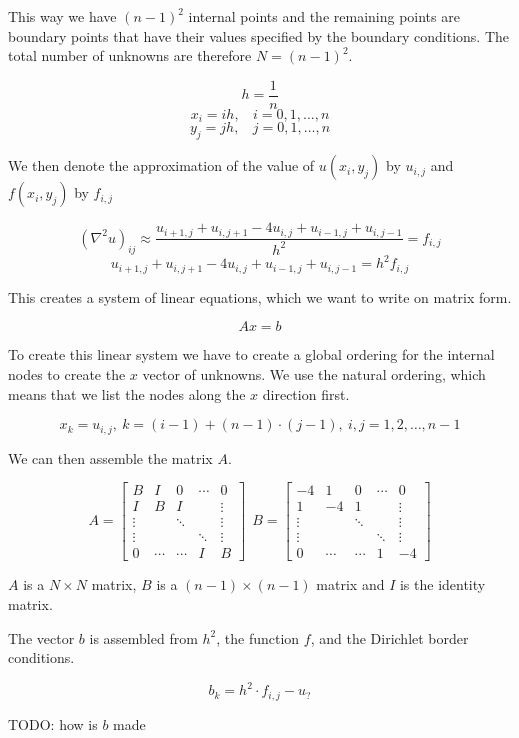 This way we have $(n-1)^2$ internal points and the remaining points are boundary
points that have their values specified by the boundary conditions. The total
number of unknowns are therefore $N = (n-1)^2$.

$$h = \frac{1}{n}$$
$$x_i = ih, ~~~~ i = 0, 1, \dots, n$$
$$y_j = jh, ~~~~ j = 0, 1, \dots, n$$

We then denote the approximation of the value of $u(x_i, y_j)$ by $u_{i,j}$ and 
$f(x_i, y_j)$ by $f_{i,j}$

$$ (\nabla^2 u)_{ij} \approx \frac{u_{i+1,j} + u_{i,j+1} - 4u_{i,j} + u_{i-1,j} + u_{i,j-1}}{h^2} = f_{i,j} $$
$$ u_{i+1,j} + u_{i,j+1} - 4u_{i,j} + u_{i-1,j} + u_{i,j-1} = h^2 f_{i,j} $$

This creates a system of linear equations, which we want to write on matrix form.

$$Ax = b$$

To create this linear system we have to create a global ordering for the
internal nodes to create the $x$ vector of unknowns. We use the natural
ordering, which means that we list the nodes along the $x$ direction first.

$$x_k = u_{i,j}, ~ k = (i-1) + (n-1) \cdot (j-1), ~ i, j = 1, 2, \dots, n-1$$

We can then assemble the matrix $A$.

$$
A = \begin{bmatrix}
 B & I & 0 & \cdots & 0 \\
 I & B & I &   & \vdots \\
 \vdots &   & \ddots &   & \vdots \\
 \vdots &   &   & \ddots & \vdots \\
 0 & \cdots & \cdots & I & B 
\end{bmatrix}
~~
B = \begin{bmatrix}
-4 & 1 & 0 & \cdots & 0 \\
 1 &-4 & 1 &   & \vdots \\
 \vdots &   & \ddots &   & \vdots \\
 \vdots &   &   & \ddots & \vdots \\
 0 & \cdots & \cdots & 1 &-4 
\end{bmatrix}
$$

$A$ is a $N \times N$ matrix, $B$ is a $(n-1) \times (n-1)$ matrix and $I$ is the identity matrix.

The vector $b$ is assembled from $h^2$, the function $f$, and the Dirichlet border conditions. 

$$ b_k = h^2 \cdot f_{i,j} - u_{?} $$

TODO: how is $b$ made
